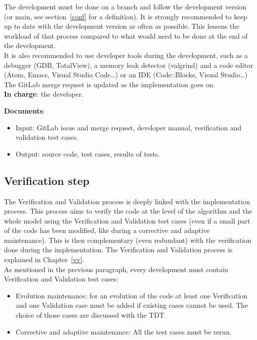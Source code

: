 The development must be done on a branch and follow the development version (or
main, see section~\ref{conf} for a definition). It is strongly recommended to
keep up to date with the development version as often as possible. This lessens
the workload of that process compared to what would need to be done at the end
of the development.\\

It is also recommended to use developer tools during the development, such as a
debugger (GDB, TotalView), a memory leak detector (valgrind) and a code editor
(Atom, Emacs, Visual Studio Code\ldots) or an IDE (Code::Blocks, Visual
Studio\ldots)\\

The GitLab merge request is updated as the implementation goes on.\\

\textbf{In charge}: the developer.

\textbf{Documents}:
\begin{itemize}
\item Input: GitLab issue and merge request, developer manual, verification and
   validation test cases.
\item Output: source code, test cases, results of tests.
\end{itemize}

\subsection{Verification step}

The Verification and Validation process is deeply linked with the
implementation process. This process aims to verify the code at the level of
the algorithm and the whole model using the Verification and Validation test
cases (even if a small part of the code has been modified, like during a
corrective and adaptive maintenance). This is then complementary (even
redundant) with the verification done during the implementation. The
Verification and Validation process is explained in Chapter~\ref{vv}.\\

As mentioned in the previous paragraph, every development must contain
Verification and Validation test cases:
\begin{itemize}
\item Evolution maintenance: for an evolution of the code at least one
  Verification and one Validation case must be added if existing cases cannot
  be used. The choice of those cases are discussed with the TDT\@.
\item Corrective and adaptive maintenance: All the test cases must be rerun.
\end{itemize}

